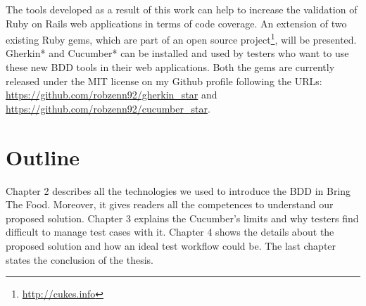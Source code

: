 The tools developed as a result of this work can help to increase the validation of Ruby on Rails web applications in terms of code coverage. An extension of two existing Ruby gems, which are part of an open source project\footnote{\url{http://cukes.info}}, will be presented. Gherkin* and Cucumber* can be installed and used by testers who want to use these new BDD tools in their web applications. Both the gems are currently released under the MIT license on my Github profile following the URLs: \url{https://github.com/robzenn92/gherkin_star} and \url{https://github.com/robzenn92/cucumber_star}.

\section{Outline}

Chapter 2 describes all the technologies we used to introduce the BDD in Bring The Food. Moreover, it gives readers all the competences to understand our proposed solution. Chapter 3 explains the Cucumber's limits and why testers find difficult to manage test cases with it. Chapter 4 shows the details about the proposed solution and how an ideal test workflow could be. The last chapter states the conclusion of the thesis.